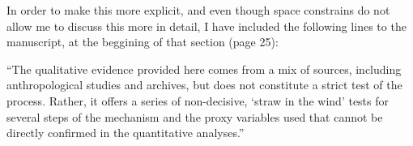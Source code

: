 \documentclass[12pt, a4paper, notitlepage]{article}
\begin{document}
In order to make this more explicit, and even though space constrains do not allow me to discuss this more in detail, I have included the following lines to the manuscript, at the beggining of that section (page 25):

``The qualitative evidence provided here comes from a mix of sources, including anthropological studies and archives, but does not constitute a strict test of the process.
Rather, it offers a series of non-decisive, `straw in the wind' tests \citep{Collier:2011ve} for several steps of the mechanism and the proxy variables used that cannot be directly confirmed in the quantitative analyses.''



\end{document}

